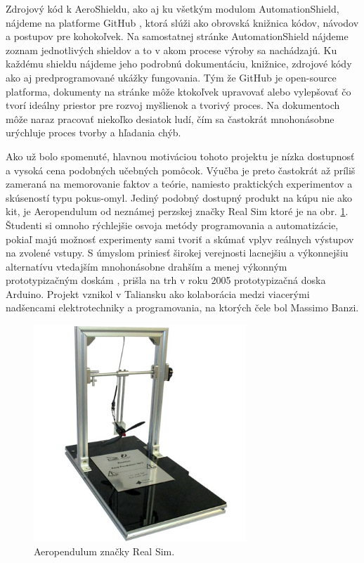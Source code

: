 Zdrojový kód k AeroShieldu, ako aj ku všetkým modulom AutomationShield, nájdeme na platforme GitHub \cite{Git}, ktorá slúži ako obrovská knižnica kódov, návodov a postupov pre kohokoľvek. Na samostatnej stránke AutomationShield nájdeme zoznam jednotlivých shieldov a to v akom procese výroby sa nachádzajú. Ku každému shieldu nájdeme jeho podrobnú dokumentáciu, knižnice, zdrojové kódy ako aj predprogramované ukážky fungovania. Tým že GitHub je open-source platforma, dokumenty na stránke môže ktokoľvek upravovať alebo vylepšovať čo tvorí ideálny priestor pre rozvoj myšlienok a tvorivý proces. Na dokumentoch môže naraz pracovať niekoľko desiatok ludí, čím sa častokrát mnohonásobne urýchluje proces tvorby a hľadania chýb.

Ako už bolo spomenuté, hlavnou motiváciou tohoto projektu je nízka dostupnosť a vysoká cena podobných učebných pomôcok. Výučba je preto častokrát až príliš zameraná na memorovanie faktov a teórie, namiesto praktických experimentov a skúseností typu pokus-omyl. Jediný podobný dostupný produkt na kúpu nie ako kit, je Aeropendulum od neznámej perzskej značky Real Sim ktoré je na obr. \ref{OBRAZOK 1.2}. Študenti si omnoho rýchlejšie osvoja metódy programovania a automatizácie, pokiaľ majú možnosť experimenty sami tvoriť a skúmať vplyv reálnych výstupov na zvolené vstupy. S úmyslom priniesť širokej verejnosti lacnejšiu a výkonnejšiu alternatívu vtedajším mnohonásobne drahším a menej výkonným prototypizačným doskám \cite{stamp}, prišla na trh v roku 2005 prototypizačná doska Arduino. Projekt vznikol v Taliansku ako kolaborácia medzi viacerými nadšencami elektrotechniky a programovania, na ktorých čele bol Massimo Banzi.

\begin{figure}[!tbh]
\centering
\includegraphics[width=80mm]{obr/pendulum.jpg}
\caption{{Aeropendulum značky Real Sim\cite{AeroPendulumTeheran}.}}\label{OBRAZOK 1.2}
\end{figure}

